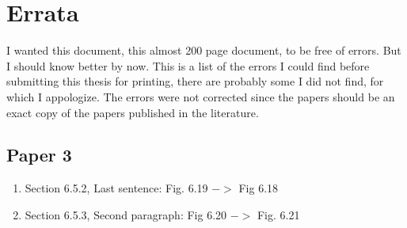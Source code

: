 \chapter*{Errata}
I wanted this document, this almost 200 page document, to be free of
errors. But I should know better by now. This is a list of the errors
I could find before submitting this thesis for printing, there are
probably some I did not find, for which I appologize. The errors were
not corrected since the papers should be an exact copy of the papers
published in the literature. 

\section*{Paper 3}
\begin{enumerate}
\item Section 6.5.2, Last sentence: Fig. 6.19 $->$ Fig 6.18
\item Section 6.5.3, Second paragraph: Fig 6.20 $->$ Fig. 6.21
\end{enumerate} 
